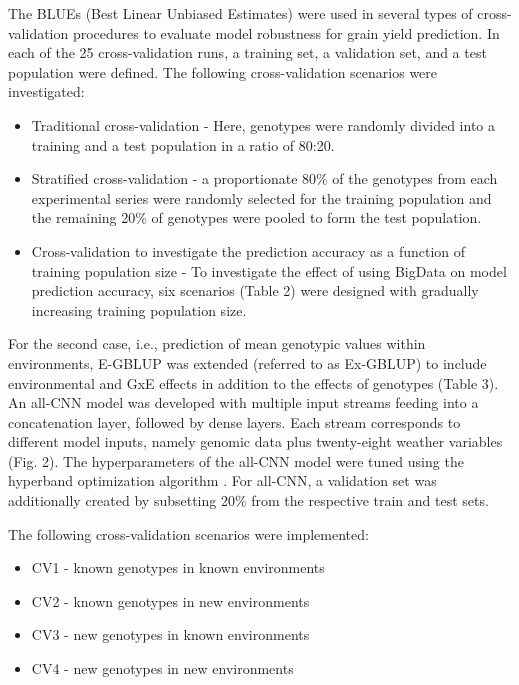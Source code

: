 \documentclass[english, biblatex]{lni}
\begin{document}
The BLUEs (Best Linear Unbiased Estimates) were used in several types of cross-validation procedures to evaluate model robustness for grain yield prediction. In each of the 25 cross-validation runs, a training set, a validation set, and a test population were defined. The following cross-validation scenarios were investigated:

\begin{itemize}
    \item Traditional cross-validation - Here, genotypes were randomly divided into a training and a test population in a ratio of 80:20.
    \item Stratified cross-validation - a proportionate 80\% of the genotypes from each experimental series were randomly selected for the training population and the remaining 20\% of genotypes were pooled to form the test population.
    \item Cross-validation to investigate the prediction accuracy as a function of training population size - To investigate the effect of using BigData on model prediction accuracy, six scenarios (Table 2) were designed with gradually increasing training population size. 
\end{itemize}

For the second case, i.e., prediction of mean genotypic values within environments, E-GBLUP was extended (referred to as Ex-GBLUP) to include environmental and GxE effects in addition to the effects of genotypes (Table 3). An all-CNN model was developed with multiple input streams feeding into a concatenation layer, followed by dense layers. Each stream corresponds to different model inputs, namely genomic data plus twenty-eight weather variables (Fig. 2). The hyperparameters of the all-CNN model were tuned using the hyperband optimization algorithm \cite{li_hyperband_2018}. For all-CNN, a validation set was additionally created by subsetting 20\% from the respective train and test sets. 

The following cross-validation scenarios were implemented:

\begin{itemize}
    \item CV1 - known genotypes in known environments
    \item CV2 - known genotypes in new environments
    \item CV3 - new genotypes in known environments
    \item CV4 - new genotypes in new environments
\end{itemize}
\end{document}
